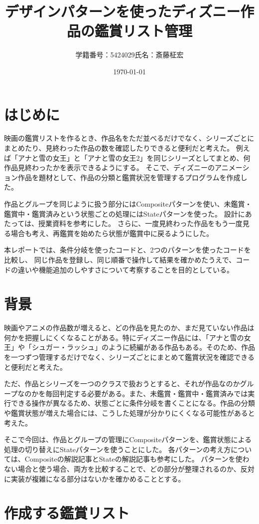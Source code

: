 \documentclass[dvipdfmx,a4paper,11pt]{jsarticle}
\title{デザインパターンを使ったディズニー作品の鑑賞リスト管理}
\author{学籍番号：5424029{\hspace{35mm}}\quad 氏名：斎藤柾宏{\hspace{35mm}}}
\date{\today}
\begin{document}
\maketitle
\section{はじめに}
映画の鑑賞リストを作るとき、作品名をただ並べるだけでなく、シリーズごとにまとめたり、見終わった作品の数を確認したりできると便利だと考えた。
例えば「アナと雪の女王」と「アナと雪の女王2」を同じシリーズとしてまとめ、何作品見終わったかを表示できるようにする。
そこで、ディズニーのアニメーション作品を題材として、作品の分類と鑑賞状況を管理するプログラムを作成した。

作品とグループを同じように扱う部分にはCompositeパターンを使い、未鑑賞・鑑賞中・鑑賞済みという状態ごとの処理にはStateパターンを使った。
設計にあたっては、授業資料\cite{1,2}を参考にした。
さらに、一度見終わった作品をもう一度見る場合も考え、再鑑賞を始めたら状態が鑑賞中に戻るようにした。

本レポートでは、条件分岐を使ったコードと、2つのパターンを使ったコードを比較し、
同じ作品を登録し、同じ順番で操作して結果を確かめたうえで、コードの違いや機能追加のしやすさについて考察することを目的としている。

\section{背景}
映画やアニメの作品数が増えると、どの作品を見たのか、まだ見ていない作品は何かを把握しにくくなることがある。特にディズニー作品には、「アナと雪の女王」や「シュガー・ラッシュ」のように続編がある作品もある。そのため、作品を一つずつ管理するだけでなく、シリーズごとにまとめて鑑賞状況を確認できると便利だと考えた。

ただ、作品とシリーズを一つのクラスで扱おうとすると、それが作品なのかグループなのかを毎回判定する必要がある。また、未鑑賞・鑑賞中・鑑賞済みでは実行できる操作が異なるため、状態ごとに条件分岐を書くことになる。作品の分類や鑑賞状態が増えた場合には、こうした処理が分かりにくくなる可能性があると考えた。

そこで今回は、作品とグループの管理にCompositeパターンを、鑑賞状態による処理の切り替えにStateパターンを使うことにした。
各パターンの考え方については、Compositeの解説記事\cite{3}とStateの解説記事\cite{4}も参考にした。
パターンを使わない場合と使う場合、両方を比較することで、どの部分が整理されるのか、反対に実装が複雑になる部分はないかを確かめることとする。
\newpage
\section{作成する鑑賞リスト}
\end{document}
